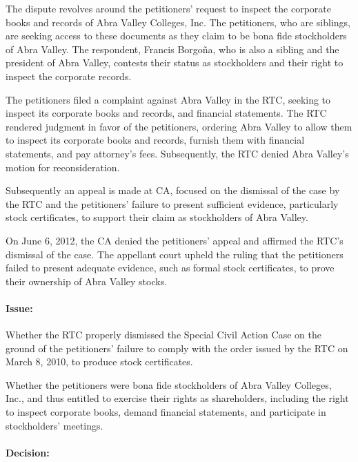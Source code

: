 \documentclass[
12pt,
oneside,
onehalfspacing,
headsepline
]{DigestCollection}
\begin{document}
The dispute revolves around the petitioners' request to inspect the corporate books and records of Abra Valley Colleges, Inc. The petitioners, who are siblings, are seeking access to these documents as they claim to be bona fide stockholders of Abra Valley. The respondent, Francis Borgoña, who is also a sibling and the president of Abra Valley, contests their status as stockholders and their right to inspect the corporate records.

The petitioners filed a complaint against Abra Valley in the RTC, seeking to inspect its corporate books and records, and financial statements. The RTC rendered judgment in favor of the petitioners, ordering Abra Valley to allow them to inspect its corporate books and records, furnish them with financial statements, and pay attorney’s fees. Subsequently, the RTC denied Abra Valley’s motion for reconsideration.

Subsequently an appeal is made at CA, focused on the dismissal of the case by the RTC and the petitioners' failure to present sufficient evidence, particularly stock certificates, to support their claim as stockholders of Abra Valley.

On June 6, 2012, the CA denied the petitioners' appeal and affirmed the RTC's dismissal of the case. The appellant court upheld the ruling that the petitioners failed to present adequate evidence, such as formal stock certificates, to prove their ownership of Abra Valley stocks.

\paragraph{Issue:}
\label{341ac960-0f91-11ef-a737-5534cab7361b}


Whether the RTC properly dismissed the Special Civil Action Case on the ground of the petitioners’ failure to comply with the order issued by the RTC on March 8, 2010, to produce stock certificates.

Whether the petitioners were bona fide stockholders of Abra Valley Colleges, Inc., and thus entitled to exercise their rights as shareholders, including the right to inspect corporate books, demand financial statements, and participate in stockholders' meetings.

\paragraph{Decision:}
\label{364fd1d0-0f91-11ef-a737-5534cab7361b}
\end{document}
